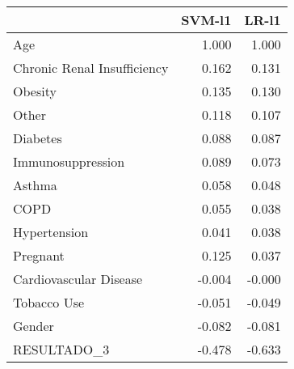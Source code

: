 \begin{tabular}{lrr}
\toprule
{} &  SVM-l1 &  LR-l1 \\
\midrule
Age                         &   1.000 &  1.000 \\
Chronic Renal Insufficiency &   0.162 &  0.131 \\
Obesity                     &   0.135 &  0.130 \\
Other                       &   0.118 &  0.107 \\
Diabetes                    &   0.088 &  0.087 \\
Immunosuppression           &   0.089 &  0.073 \\
Asthma                      &   0.058 &  0.048 \\
COPD                        &   0.055 &  0.038 \\
Hypertension                &   0.041 &  0.038 \\
Pregnant                    &   0.125 &  0.037 \\
Cardiovascular Disease      &  -0.004 & -0.000 \\
Tobacco Use                 &  -0.051 & -0.049 \\
Gender                      &  -0.082 & -0.081 \\
RESULTADO\_3                 &  -0.478 & -0.633 \\
\bottomrule
\end{tabular}
